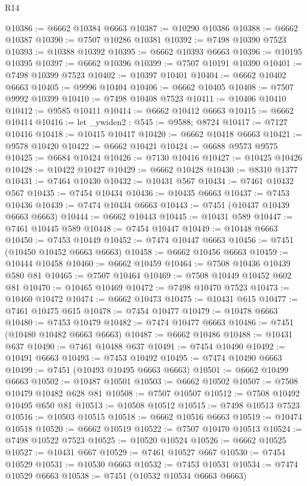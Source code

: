 \begin{lexlean}{R14}
\begin{coremodule}
{{{{{{{{{{{{{{{{{{{{{{{{{{{{{{{{{{{{{{{{{{{{{{{{{{{{{{{{{{{{{{{{{{{{{{{{{{{{{{{{{{@10386 := @6662 @10384 @6663
@10387 := @10290 @10386
@10388 := @6662 @10387
@10390 := @7507 @10286 @10381
@10392 := @7498 @10390 @7523
@10393 := @10388 @10392
@10395 := @6662 @10393 @6663
@10396 := @10195 @10395
@10397 := @6662 @10396
@10399 := @7507 @10191 @10390
@10401 := @7498 @10399 @7523
@10402 := @10397 @10401
@10404 := @6662 @10402 @6663
@10405 := @9996 @10404
@10406 := @6662 @10405
@10408 := @7507 @9992 @10399
@10410 := @7498 @10408 @7523
@10411 := @10406 @10410
@10412 := @9585 @10411
@10414 := @6662 @10412 @6663
@10415 := @6662 @10414
@10416 := let _ywiden2 : @545 := @9588; @8724
@10417 := @7127 @10416
@10418 := @10415 @10417
@10420 := @6662 @10418 @6663
@10421 := @9578 @10420
@10422 := @6662 @10421
@10424 := @6688 @9573 @9575
@10425 := @6684 @10424
@10426 := @7130 @10416
@10427 := @10425 @10426
@10428 := @10422 @10427
@10429 := @6662 @10428
@10430 := @8310 @1377
@10431 := @7464 @10430
@10432 := @10431 @567
@10434 := @7461 @10432 @567
@10435 := @7454 @10434
@10436 := @10435 @6663
@10437 := @7453 @10436
@10439 := @7474 @10434 @6663
@10443 := @7451 (@10437 @10439 @6663 @6663)
@10444 := @6662 @10443
@10445 := @10431 @589
@10447 := @7461 @10445 @589
@10448 := @7454 @10447
@10449 := @10448 @6663
@10450 := @7453 @10449
@10452 := @7474 @10447 @6663
@10456 := @7451 (@10450 @10452 @6663 @6663)
@10458 := @6662 @10456 @6663
@10459 := @10444 @10458
@10460 := @6662 @10459
@10464 := @7508 @10436 @10439 @580 @81
@10465 := @7507 @10464
@10469 := @7508 @10449 @10452 @602 @81
@10470 := @10465 @10469
@10472 := @7498 @10470 @7523
@10473 := @10460 @10472
@10474 := @6662 @10473
@10475 := @10431 @615
@10477 := @7461 @10475 @615
@10478 := @7454 @10477
@10479 := @10478 @6663
@10480 := @7453 @10479
@10482 := @7474 @10477 @6663
@10486 := @7451 (@10480 @10482 @6663 @6663)
@10487 := @6662 @10486
@10488 := @10431 @637
@10490 := @7461 @10488 @637
@10491 := @7454 @10490
@10492 := @10491 @6663
@10493 := @7453 @10492
@10495 := @7474 @10490 @6663
@10499 := @7451 (@10493 @10495 @6663 @6663)
@10501 := @6662 @10499 @6663
@10502 := @10487 @10501
@10503 := @6662 @10502
@10507 := @7508 @10479 @10482 @628 @81
@10508 := @7507 @10507
@10512 := @7508 @10492 @10495 @650 @81
@10513 := @10508 @10512
@10515 := @7498 @10513 @7523
@10516 := @10503 @10515
@10518 := @6662 @10516 @6663
@10519 := @10474 @10518
@10520 := @6662 @10519
@10522 := @7507 @10470 @10513
@10524 := @7498 @10522 @7523
@10525 := @10520 @10524
@10526 := @6662 @10525
@10527 := @10431 @667
@10529 := @7461 @10527 @667
@10530 := @7454 @10529
@10531 := @10530 @6663
@10532 := @7453 @10531
@10534 := @7474 @10529 @6663
@10538 := @7451 (@10532 @10534 @6663 @6663)
}}}}}}}}}}}}}}}}}}}}}}}}}}}}}}}}}}}}}}}}}}}}}}}}}}}}}}}}}}}}}}}}}}}}}}}}}}}}}}}}}}
\end{coremodule}
\end{lexlean}
